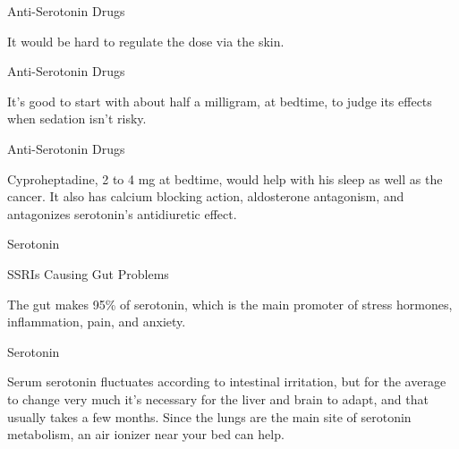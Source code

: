 \documentclass[11pt,oneside,openany,extrafontsizes]{memoir}
\begin{document}
\begin{standalonequote}{Anti-Serotonin Drugs}

    \begin{answer}
        It would be hard to regulate the dose via the skin.
    \end{answer}
\end{standalonequote}

\begin{standalonequote}{Anti-Serotonin Drugs}

    \begin{answer}
        It's good to start with about half a milligram, at bedtime, to judge its effects when sedation isn't risky.
    \end{answer}
\end{standalonequote}

\begin{standalonequote}{Anti-Serotonin Drugs}

    \begin{answer}
        Cyproheptadine, 2 to 4 mg at bedtime, would help with his sleep as well as the cancer. It also has calcium blocking action, aldosterone antagonism, and antagonizes serotonin's antidiuretic effect.
    \end{answer}
\end{standalonequote}

\begin{standalonequote}{Serotonin}
    \begin{note}
        SSRIs Causing Gut Problems
    \end{note}

    \begin{answer}
        The gut makes 95\% of serotonin, which is the main promoter of stress hormones, inflammation, pain, and anxiety.
    \end{answer}
\end{standalonequote}

\begin{standalonequote}{Serotonin}

    \begin{answer}
        Serum serotonin fluctuates according to intestinal irritation, but for the average to change very much it's necessary for the liver and brain to adapt, and that usually takes a few months. Since the lungs are the main site of serotonin metabolism, an air ionizer near your bed can help.
    \end{answer}
\end{standalonequote}
\end{document}
